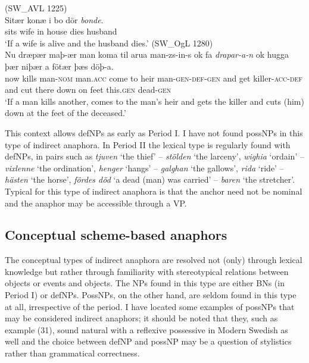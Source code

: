 \documentclass[output=paper]{langsci/langscibook}
\begin{document}
\begin{exe}
\ex\label{6ex:29}
(SW\_AVL 1225)\\
\gll Sitær konæ i bo dör {\emph{bonde}}. \\
sits wife in house dies husband \\
\glt `If a wife is alive and the husband dies.' 
\ex\label{6ex:30}
(SW\_OgL 1280)\\
\gll Nu dræpær maþ-ær man koma til arua man-zs-in-s ok fa {\emph{drapar-a-n}} ok hugga þær niþær a fötær þæs döþ-a. \\
now kills man-{\textsc{nom}} man.{\textsc{acc}} come to heir man-{\textsc{gen-def-gen}} and get killer-{\textsc{acc-def}} and cut there down on feet this.{\textsc{gen}} dead-{\textsc{gen}} \\
\glt `If a man kills another, comes to the man's heir and gets the killer and cuts (him) down at the feet of the deceased.'
\end{exe}

This context allows defNPs as early as Period I. I have not found possNPs in this type of indirect anaphora. In Period II the lexical type is regularly found with defNPs, in pairs such as {\emph{tjuven}} `the thief' -- {\emph{stölden}} `the larceny', {\emph{wighia}} `ordain' -- {\emph{vixlenne}} `the ordination', {\emph{henger}} `hangs' -- {\emph{galghan}} `the gallows', {\emph{rida}} `ride' -- {\emph{hästen}} `the horse', {\emph{fördes död}} `a dead (man) was carried' -- {\emph{baren}} `the stretcher'. Typical for this type of indirect anaphora is that the anchor need not be nominal and the anaphor may be accessible through a VP.


\subsection{Conceptual scheme-based anaphors}\label{6sec:43}

The conceptual types of indirect anaphora are resolved not (only) through lexical knowledge but rather through familiarity with stereotypical relations between objects or events and objects. The NPs found in this type are either BNs (in Period I) or defNPs. PossNPs, on the other hand, are seldom found in this type at all, irrespective of the period. I have located some examples of possNPs that may be considered indirect anaphors; it should be noted that they, such as example (31), sound natural with a reflexive possessive in Modern Swedish as well and the choice between defNP and possNP may be a question of stylistics rather than grammatical correctness.
\end{document}
